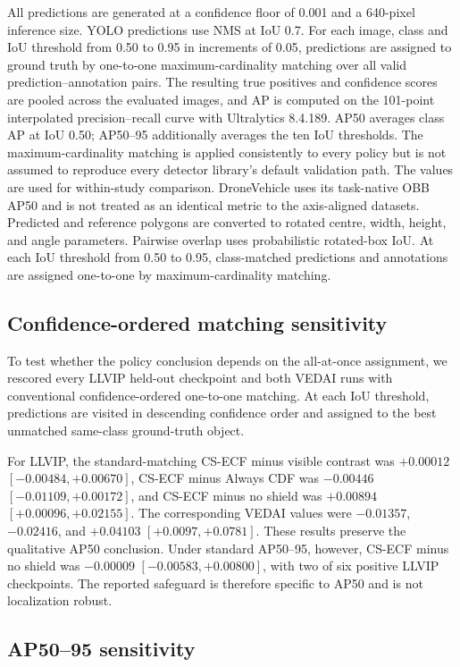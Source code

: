 \documentclass[11pt]{article}
\begin{document}
All predictions are generated at a confidence floor of 0.001 and a 640-pixel
inference size. YOLO predictions use NMS at IoU 0.7. For each image, class and
IoU threshold from 0.50 to 0.95 in increments of 0.05, predictions are assigned
to ground truth by one-to-one maximum-cardinality matching over all valid
prediction--annotation pairs. The resulting true positives and confidence
scores are pooled across the evaluated images, and AP is computed on the
101-point interpolated precision--recall curve with Ultralytics 8.4.189.
AP50 averages class AP at IoU 0.50; AP50--95 additionally averages the ten IoU
thresholds. The maximum-cardinality matching is applied consistently to every
policy but is not assumed to reproduce every detector library's default
validation path. The values are used for within-study comparison. DroneVehicle
uses its task-native OBB AP50 and is not treated as an identical metric to the
axis-aligned datasets. Predicted and reference polygons are converted to
rotated centre, width, height, and angle parameters. Pairwise overlap uses
probabilistic rotated-box IoU. At each IoU threshold from 0.50 to 0.95,
class-matched predictions and annotations are assigned one-to-one by
maximum-cardinality matching.

\subsection{Confidence-ordered matching sensitivity}

To test whether the policy conclusion depends on the all-at-once assignment,
we rescored every LLVIP held-out checkpoint and both VEDAI runs with
conventional confidence-ordered one-to-one matching. At each IoU threshold,
predictions are visited in descending confidence order and assigned to the
best unmatched same-class ground-truth object.

For LLVIP, the standard-matching CS-ECF minus visible contrast was
\(+0.00012\) \([-0.00484,+0.00670]\), CS-ECF minus Always CDF was
\(-0.00446\) \([-0.01109,+0.00172]\), and CS-ECF minus no shield was
\(+0.00894\) \([+0.00096,+0.02155]\). The corresponding VEDAI values were
\(-0.01357\), \(-0.02416\), and \(+0.04103\) \([+0.0097,+0.0781]\).
These results preserve the qualitative AP50 conclusion. Under standard
AP50--95, however, CS-ECF minus no shield was \(-0.00009\)
\([-0.00583,+0.00800]\), with two of six
positive LLVIP checkpoints. The reported safeguard is therefore specific to
AP50 and is not localization robust.

\subsection{AP50--95 sensitivity}
\end{document}

